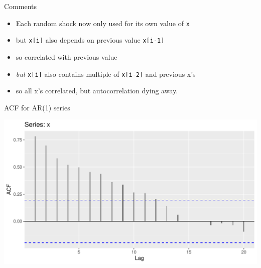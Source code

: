 \documentclass[ignorenonframetext,]{beamer}
\newenvironment{Shaded}{\begin{snugshade}}{\end{snugshade}}
\newcommand{\DataTypeTok}[1]{\textcolor[rgb]{0.13,0.29,0.53}{#1}}
\newcommand{\KeywordTok}[1]{\textcolor[rgb]{0.13,0.29,0.53}{\textbf{#1}}}
\newcommand{\NormalTok}[1]{#1}
\newcommand{\OperatorTok}[1]{\textcolor[rgb]{0.81,0.36,0.00}{\textbf{#1}}}
\newcommand{\StringTok}[1]{\textcolor[rgb]{0.31,0.60,0.02}{#1}}
\providecommand{\tightlist}{%
  \setlength{\itemsep}{0pt}\setlength{\parskip}{0pt}}
\begin{document}
\begin{frame}[fragile]{Comments}
\protect\hypertarget{comments-51}{}

\begin{itemize}
\tightlist
\item
  Each random shock now only used for its own value of \texttt{x}
\item
  but \texttt{x{[}i{]}} also depends on previous value
  \texttt{x{[}i-1{]}}
\item
  so correlated with previous value
\item
  \emph{but} \texttt{x{[}i{]}} also contains multiple of
  \texttt{x{[}i-2{]}} and previous x's
\item
  so all x's correlated, but autocorrelation dying away.
\end{itemize}

\end{frame}

\begin{frame}[fragile]{ACF for AR(1) series}
\protect\hypertarget{acf-for-ar1-series}{}

\begin{Shaded}
\end{Shaded}

\includegraphics{figure/unnamed-chunk-604-1.pdf}

\end{frame}
\end{document}
